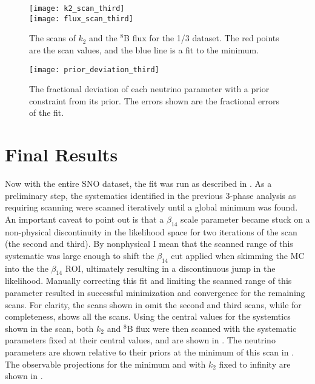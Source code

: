 \begin{figure}
\centering
\texttt{[image: k2\_scan\_third]} \\
\vspace{12pt}
\texttt{[image: flux\_scan\_third]}
\caption{The scans of $k_2$ and the $^8$B flux for the 1/3 dataset. The red points are the scan values, and the blue line is a fit to the minimum.}
\label{fig:third_scans}
\end{figure}

\begin{figure}
\centering
\texttt{[image: prior\_deviation\_third]}
\caption{The fractional deviation of each neutrino parameter with a prior constraint from its prior. The errors shown are the fractional errors of the fit.}
\label{fig:priors_third}
\end{figure}

\clearpage

\section{Final Results}
\label{final}

Now with the entire SNO dataset, the fit was run as described in . 
As a preliminary step, the systematics identified in the previous 3-phase analysis as requiring scanning were scanned iteratively until a global minimum was found.
An important caveat to point out is that a $\beta_{14}$ scale parameter became stuck on a non-physical discontinuity in the likelihood space for two iterations of the scan (the second and third).
By nonphysical I mean that the scanned range of this systematic was large enough to shift the $\beta_{14}$ cut applied when skimming the MC into the the $\beta_{14}$ ROI, ultimately resulting in a discontinuous jump in the likelihood.
Manually correcting this fit and limiting the scanned range of this parameter resulted in successful minimization and convergence for the remaining scans.
For clarity, the scans shown in  omit the second and third scans, while for completeness,  shows all the scans. 
Using the central values for the systemtics shown in the scan, both $k_2$ and $^8$B flux were then scanned with the systematic parameters fixed at their central values, and are shown in .
The neutrino parameters are shown relative to their priors at the minimum of this scan in .
The observable projections for the minimum and with $k_2$ fixed to infinity are shown in .

